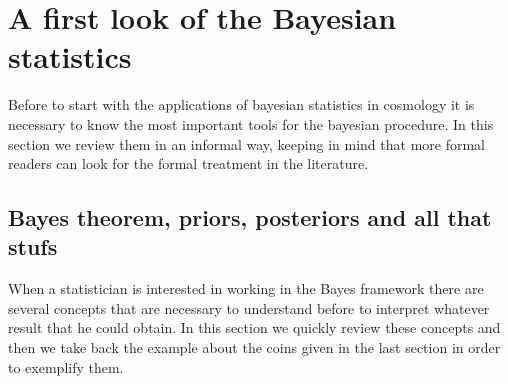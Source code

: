 \documentclass[onecolumn,           %
               showpacs,            %
               preprintnumbers,     %
               aps,                 %
               prl,          	    %
               letterpaper,             %
               superscriptaddress,      %
               nofootinbib,         %
               tightenlines,        %
               floats,floatfix      %
               ,usenatbib,
               ]{revtex4-1}
\begin{document}

\section{A first look of the Bayesian statistics}

Before to start with the applications of bayesian statistics in cosmology it is necessary to know the most important tools for the bayesian procedure. In this section we review them in an informal way, keeping in mind that more formal readers can look for the formal treatment in the literature.   

\subsection{Bayes theorem, priors, posteriors and all that stufs}\label{BTPP}

When a statistician is interested in working in the Bayes framework there are several concepts that are necessary to understand before to interpret whatever result that he could obtain. In this section we quickly review these concepts and then we take back the example about the coins given in the last section in order to exemplify them. 
\end{document}

